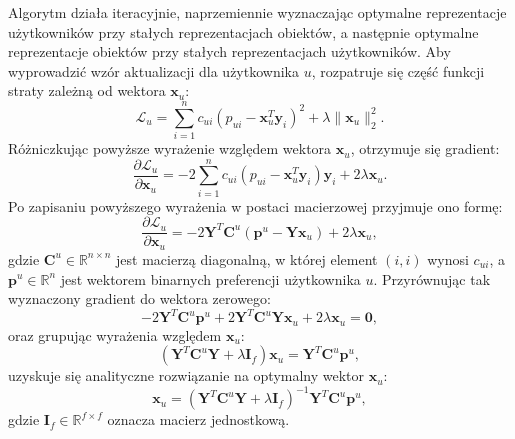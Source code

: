 Algorytm działa iteracyjnie, naprzemiennie wyznaczając optymalne reprezentacje użytkowników przy stałych reprezentacjach obiektów, a następnie optymalne reprezentacje obiektów przy stałych reprezentacjach użytkowników. Aby wyprowadzić wzór aktualizacji dla użytkownika $u$, rozpatruje się część funkcji straty zależną od wektora $\mathbf{x}_u$:
\begin{equation}
    \mathcal{L}_u = \sum_{i=1}^{n} c_{ui} \left( p_{ui} - \mathbf{x}_u^T \mathbf{y}_i \right)^2 + \lambda \|\mathbf{x}_u\|_2^2.
\end{equation}
Różniczkując powyższe wyrażenie względem wektora $\mathbf{x}_u$, otrzymuje się gradient:
\begin{equation}
    \frac{\partial \mathcal{L}_u}{\partial \mathbf{x}_u} = -2 \sum_{i=1}^{n} c_{ui} \left( p_{ui} - \mathbf{x}_u^T \mathbf{y}_i \right) \mathbf{y}_i + 2 \lambda \mathbf{x}_u.
\end{equation}
Po zapisaniu powyższego wyrażenia w postaci macierzowej przyjmuje ono formę:
\begin{equation}
    \frac{\partial \mathcal{L}_u}{\partial \mathbf{x}_u} = -2 \mathbf{Y}^T \mathbf{C}^u \left( \mathbf{p}^u - \mathbf{Y} \mathbf{x}_u \right) + 2 \lambda \mathbf{x}_u,
\end{equation}
gdzie $\mathbf{C}^u \in \mathbb{R}^{n \times n}$ jest macierzą diagonalną, w której element $(i,i)$ wynosi $c_{ui}$, a $\mathbf{p}^u \in \mathbb{R}^n$ jest wektorem binarnych preferencji użytkownika $u$. Przyrównując tak wyznaczony gradient do wektora zerowego:
\begin{equation}
    -2 \mathbf{Y}^T \mathbf{C}^u \mathbf{p}^u + 2 \mathbf{Y}^T \mathbf{C}^u \mathbf{Y} \mathbf{x}_u + 2 \lambda \mathbf{x}_u = \mathbf{0},
\end{equation}
oraz grupując wyrażenia względem $\mathbf{x}_u$:
\begin{equation}
    \left( \mathbf{Y}^T \mathbf{C}^u \mathbf{Y} + \lambda \mathbf{I}_f \right) \mathbf{x}_u = \mathbf{Y}^T \mathbf{C}^u \mathbf{p}^u,
    \label{eq:ials_user_update}
\end{equation}
uzyskuje się analityczne rozwiązanie na optymalny wektor $\mathbf{x}_u$:
\begin{equation}
    \mathbf{x}_u = \left( \mathbf{Y}^T \mathbf{C}^u \mathbf{Y} + \lambda \mathbf{I}_f \right)^{-1} \mathbf{Y}^T \mathbf{C}^u \mathbf{p}^u,
\end{equation}
gdzie $\mathbf{I}_f \in \mathbb{R}^{f \times f}$ oznacza macierz jednostkową.

